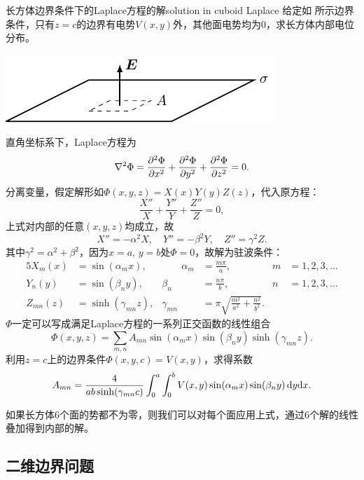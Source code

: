 \begin{example}{长方体边界条件下的Laplace方程的解}{solution in cuboid Laplace}
    给定如 所示边界条件，只有$z=c$的边界有电势$V(x,y)$外，其他面电势均为0，求长方体内部电位分布。
    \begin{center}
        \includegraphics[page=11]{figures/tikz/layouts.pdf}
        \label{fig:cuboid boundary}
    \end{center}
    直角坐标系下，Laplace方程为
    \[
        \lapla\Phi=\pv[2]\Phi x+\pv[2]\Phi y+\pv[2]\Phi z=0.
    \]
    分离变量，假定解形如$\Phi(x,y,z)=X(x)Y(y)Z(z)$，代入原方程：
    \[
        \frac{X''}X+\frac{Y''}Y+\frac{Z''}Z=0,
    \]
    上式对内部的任意$(x,y,z)$均成立，故
    \[
        X''=-\alpha^2X,\quad Y''=-\beta^2Y,\quad Z''=\gamma^2Z.
    \]
    其中$\gamma^2=\alpha^2+\beta^2$，因为$x=a,\,y=b$处$\Phi=0$，故解为驻波条件：
    \begin{alignat*}{5}
        X_m(x)&=\sin(\alpha_mx),&\qquad\alpha_m&=\frac{m\pi}a,&m&=1,2,3,\ldots\\
        Y_n(y)&=\sin(\beta_ny),&\beta_n&=\frac{n\pi}b,&n&=1,2,3,\ldots\\
        Z_{mn}(z)&=\sinh(\gamma_{mn}z),&\gamma_{mn}&=\pi\sqrt{\frac{m^2}{a^2}+\frac{n^2}{b^2}}.
    \end{alignat*}
    $\Phi$一定可以写成满足Laplace方程的一系列正交函数的线性组合
    \[
        \Phi(x,y,z)=\sum_{m,n}A_{mn}\sin(\alpha_mx)\sin(\beta_ny)\sinh(\gamma_{mn}z).
    \]
    利用$z=c$上的边界条件$\Phi(x,y,c)=V(x,y)$，求得系数
    \[
        A_{mn}=\frac4{ab\sinh(\gamma_{mn}c)}\int_0^a\int_0^bV(x,y)\sin(\alpha_mx)\sin(\beta_ny)\d y\nd x.
    \]
\end{example}
\begin{remark}
    如果长方体6个面的势都不为零，则我们可以对每个面应用上式，通过6个解的线性叠加得到内部的解。
\end{remark}

\subsection{二维边界问题}
\label{ssec:2D boundary problem}

